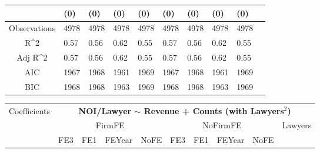 \documentclass{article}
\begin{document}
\begin{table}[H]
\begin{tabular}{|clllllllll|}
   & (0) & (0) & (0) & (0) & (0) & (0) & (0) & (0) & \\ 
  \hline 
 Observations & 4978 & 4978 & 4978 & 4978 & 4978 & 4978 & 4978 & 4978 & \\ 
  R^2 & 0.57 & 0.56 & 0.62 & 0.55 & 0.57 & 0.56 & 0.62 & 0.55 & \\ 
  Adj R^2 & 0.57 & 0.56 & 0.62 & 0.55 & 0.57 & 0.56 & 0.62 & 0.55 & \\ 
  AIC & 1967 & 1968 & 1961 & 1969 & 1967 & 1968 & 1961 & 1969 & \\ 
  BIC & 1968 & 1968 & 1963 & 1969 & 1968 & 1968 & 1963 & 1969 & \\ 
   \hline
\end{tabular}
 
\end{table}


\begin{table}[H]
\centering
\begin{tabular}{|clllllllll|}
\hline
\multirow{3}{*}{Coefficients} & \multicolumn{9}{c|}{\textbf{NOI/Lawyer $\sim$ Revenue + Counts (with Lawyers$^2$)}} \\
\cline{2-10}
& \multicolumn{4}{c}{FirmFE} & \multicolumn{4}{c}{NoFirmFE} & \multirow{2}{*}{Lawyers} \\
\cline{2-9}
& FE3 & FE1 & FEYear & NoFE & FE3 & FE1 & FEYear & NoFE &  \\
\hline
 

\end{tabular}
\end{table}
\end{document}
